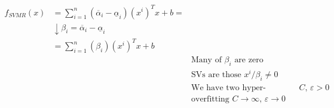 \begin{align*}
	f_{SVMR} (x) & = \sum_{i=1}^n (\overline{\alpha}_i - \underline{\alpha}_i)
	(x^i)^T x + b =                                                                                                                           \\
	             & \downarrow \beta_i = \overline{\alpha}_i - \underline{\alpha}_i                                                            \\
	             & = \sum_{i=1}^n (\beta_i) (x^i)^T x + b                                                                                     \\
	             &                                                                 & \text{Many of }\beta_i\text{ are zero}                   \\
	             &                                                                 & \text{SVs are those }x^i/\beta_i \neq 0                  \\
	             &                                                                 & \text{We have two hyper-parameters: }C,\,\varepsilon > 0 \\
	             &                                                                 & \text{overfitting } C \to \infty,\, \varepsilon \to 0
\end{align*}

